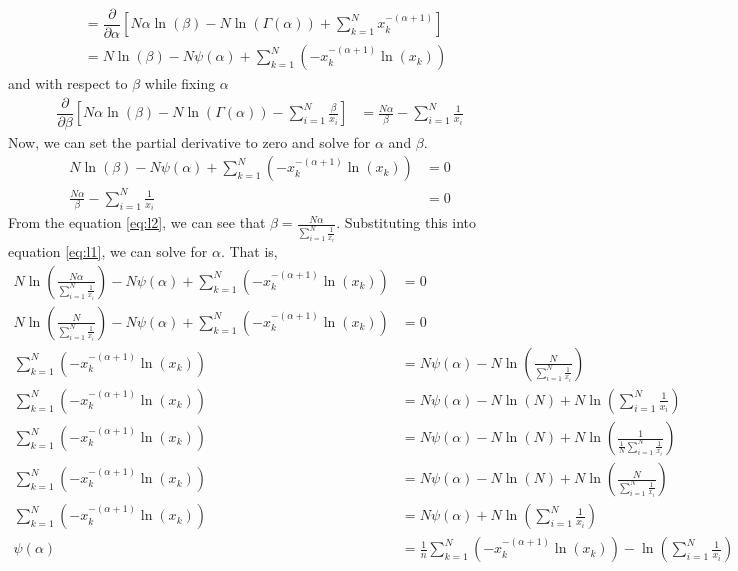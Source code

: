 \documentclass{article}
\begin{document}
\begin{enumerate}
\begin{sol}
\begin{align*}
        &=\dfrac{\partial}{\partial \alpha} \left[N{\alpha}\ln(\beta)- N\ln(\Gamma(\alpha))+\sum_{k=1}^N x_k^{-(\alpha + 1)}\right]\\ 
        &= N\ln(\beta) - N\psi(\alpha) + \sum_{k=1}^N (-x_k^{-(\alpha+1)}\ln(x_k))
    \end{align*}
    and with respect to $\beta$ while fixing $\alpha$
    \begin{align*}
        \dfrac{\partial}{\partial \beta} \left[N{\alpha}\ln(\beta)- N\ln(\Gamma(\alpha)) - \sum_{i=1}^N\frac{\beta}{x_i} \right] &= \frac{N\alpha}{\beta} - \sum_{i=1}^N \frac{1}{x_i}
    \end{align*}
    Now, we can set the partial derivative to zero and solve for $\alpha$ and $\beta$.
    \begin{align}
         N\ln(\beta) - N\psi(\alpha) + \sum_{k=1}^N (-x_k^{-(\alpha+1)}\ln(x_k)) &= 0 \label{eq:l1}\\
         \frac{N\alpha}{\beta} - \sum_{i=1}^N \frac{1}{x_i} &= 0 \label{eq:l2}
    \end{align}
    From the equation \ref{eq:l2}, we can see that $\beta = \frac{N\alpha}{\sum_{i=1}^N \frac{1}{x_i}}$. Substituting this into equation \ref{eq:l1}, we can solve for $\alpha$.
    That is,
    \begin{align*}
        N\ln\left(\frac{N\alpha}{\sum_{i=1}^N \frac{1}{x_i}}\right) - N\psi(\alpha) + \sum_{k=1}^N (-x_k^{-(\alpha+1)}\ln(x_k)) &= 0 \\
        N\ln\left(\frac{N}{\sum_{i=1}^N \frac{1}{x_i}}\right) - N\psi(\alpha) + \sum_{k=1}^N (-x_k^{-(\alpha+1)}\ln(x_k)) &= 0 \\
        \sum_{k=1}^N (-x_k^{-(\alpha+1)}\ln(x_k)) &= N\psi(\alpha) - N\ln\left(\frac{N}{\sum_{i=1}^N \frac{1}{x_i}}\right) \\
        \sum_{k=1}^N (-x_k^{-(\alpha+1)}\ln(x_k)) &= N\psi(\alpha) - N\ln(N) + N\ln\left(\sum_{i=1}^N \frac{1}{x_i}\right) \\
        \sum_{k=1}^N (-x_k^{-(\alpha+1)}\ln(x_k)) &= N\psi(\alpha) - N\ln(N) + N\ln\left(\frac{1}{\frac{1}{N}\sum_{i=1}^N \frac{1}{x_i}}\right) \\
        \sum_{k=1}^N (-x_k^{-(\alpha+1)}\ln(x_k)) &= N\psi(\alpha) - N\ln(N) + N\ln\left(\frac{N}{\sum_{i=1}^N \frac{1}{x_i}}\right) \\
        \sum_{k=1}^N (-x_k^{-(\alpha+1)}\ln(x_k)) &= N\psi(\alpha) + N\ln\left(\sum_{i=1}^N \frac{1}{x_i}\right)\\
        \psi(\alpha) &= \frac{1}{n}\sum_{k=1}^N (-x_k^{-(\alpha+1)}\ln(x_k)) - \ln(\sum_{i=1}^N \frac{1}{x_i}) \\

\end{align*}
\end{sol}
\end{enumerate}
\end{document}
